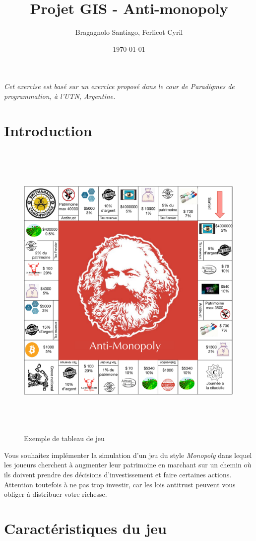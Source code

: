 \documentclass[12pt]{article}
\author{
        Bragagnolo Santiago, Ferlicot Cyril
}
\title{Projet GIS - Anti-monopoly}
\date{\today}
\begin{document}
\maketitle
\emph{Cet exercise est basé sur un exercice proposé dans le cour de Paradigmes de programmation, à l'UTN, Argentine.}

\section{Introduction}

\begin{figure}
\includegraphics[width=15cm,height=15cm,keepaspectratio]{figures/board.pdf}
\caption{Exemple de tableau de jeu}
\label{fig:tableau}
\end{figure}

	Vous souhaitez implémenter la simulation d'un jeu du style \emph{Monopoly} dans lequel les joueurs cherchent
à augmenter leur patrimoine en marchant sur un chemin où ils doivent prendre des décisions 
d'investissement et faire certaines actions. Attention toutefois à ne pas trop investir, car 
les lois antitrust peuvent vous obliger à distribuer votre richesse.


\section{Caractéristiques du jeu}
\end{document}
